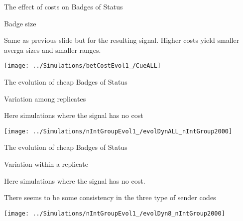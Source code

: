 \documentclass[
  ignorenonframetext,
]{beamer}
\begin{document}
\begin{frame}{The effect of costs on Badges of Status}
\protect\hypertarget{the-effect-of-costs-on-badges-of-status-1}{}

\begin{block}{Badge size}

\small

Same as previous slide but for the resulting signal. Higher costs yield
smaller averga sizes and smaller ranges.

\begin{center}\texttt{[image: ../Simulations/betCostEvol1\_/CueALL]} \end{center}

\end{block}

\end{frame}

\begin{frame}{The evolution of cheap Badges of Status}
\protect\hypertarget{the-evolution-of-cheap-badges-of-status}{}

\begin{block}{Variation among replicates}

\small

Here simulations where the signal has no cost

\begin{center}\texttt{[image: ../Simulations/nIntGroupEvol1\_/evolDynALL\_nIntGroup2000]} \end{center}

\end{block}

\end{frame}

\begin{frame}{The evolution of cheap Badges of Status}
\protect\hypertarget{the-evolution-of-cheap-badges-of-status-1}{}

\begin{block}{Variation within a replicate}

\small

Here simulations where the signal has no cost.

There seems to be some consistency in the three type of sender codes

\begin{center}\texttt{[image: ../Simulations/nIntGroupEvol1\_/evolDyn8\_nIntGroup2000]} \end{center}

\end{block}

\end{frame}
\end{document}
